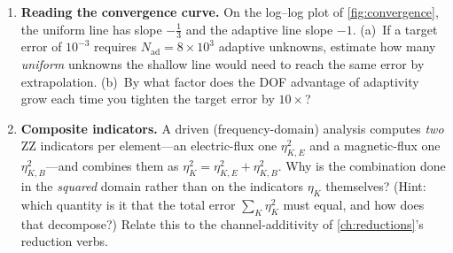 \begin{enumerate}[nosep]
  \item \textbf{Reading the convergence curve.} On the log--log plot of
  \cref{fig:convergence}, the uniform line has slope $-\tfrac13$ and the adaptive line
  slope $-1$. (a)~If a target error of $10^{-3}$ requires $N_{\text{ad}} = 8\times10^3$
  adaptive unknowns, estimate how many \emph{uniform} unknowns the shallow line would
  need to reach the same error by extrapolation. (b)~By what factor does the DOF
  advantage of adaptivity grow each time you tighten the target error by $10\times$?

  \item \textbf{Composite indicators.} A driven (frequency-domain) analysis computes
  \emph{two} ZZ indicators per element---an electric-flux one $\eta_{K,E}^2$ and a
  magnetic-flux one $\eta_{K,B}^2$---and combines them as
  $\eta_K^2 = \eta_{K,E}^2 + \eta_{K,B}^2$. Why is the combination done in the
  \emph{squared} domain rather than on the indicators $\eta_K$ themselves? (Hint: which
  quantity is it that the total error $\sum_K \eta_K^2$ must equal, and how does that
  decompose?) Relate this to the channel-additivity of \cref{ch:reductions}'s
  reduction verbs.
\end{enumerate}

